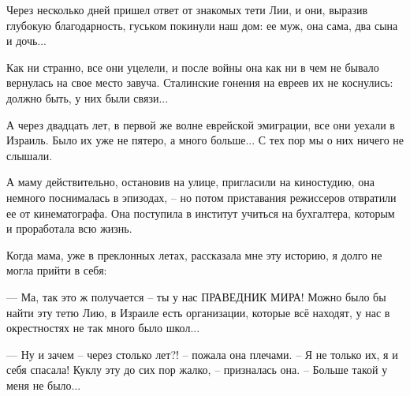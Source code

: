 Через несколько дней пришел ответ от знакомых тети Лии, и они, выразив глубокую
благодарность, гуськом покинули наш дом: ее муж, она сама, два сына и дочь...

Как ни странно, все они уцелели, и после войны она как ни в чем не бывало
вернулась на свое место завуча. Сталинские гонения на евреев их не коснулись:
должно быть, у них были связи...

А через двадцать лет, в первой же волне еврейской эмиграции, все они уехали в
Израиль. Было их уже не пятеро, а много больше... С тех пор мы о них ничего не
слышали.

А маму действительно, остановив на улице, пригласили на киностудию, она немного
поснималась в эпизодах, – но потом приставания режиссеров отвратили ее от
кинематографа. Она поступила в институт учиться на бухгалтера, которым и
проработала всю жизнь.

Когда мама, уже в преклонных летах, рассказала мне эту историю, я долго не
могла прийти в себя:

— Ма, так это ж получается – ты у нас ПРАВЕДНИК МИРА! Можно было бы найти эту
тетю Лию, в Израиле есть организации, которые всё находят, у нас в окрестностях
не так много было школ...

— Ну и зачем – через столько лет?! – пожала она плечами. – Я не только их, я и
себя спасала! Куклу эту до сих пор жалко, – призналась она. – Больше такой у
меня не было...

